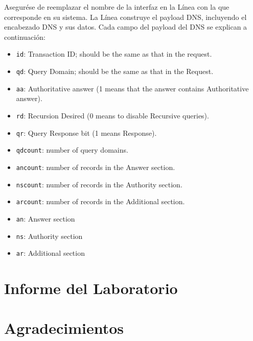 Asegurése de reemplazar el nombre de la interfaz en la Línea  con la que corresponde en su sistema.
La Línea  construye el payload DNS, incluyendo el encabezado DNS y sus datos. Cada campo del payload del DNS se explican a continuación:

 
\begin{itemize}[noitemsep]
\item \texttt{id}: Transaction ID; should be the same as that in the request.
\item \texttt{qd}: Query Domain; should be the same as that in the Request.
\item \texttt{aa}: Authoritative answer (1 means that the answer contains Authoritative answer).
\item \texttt{rd}: Recursion Desired (0 means to disable Recursive queries).
\item \texttt{qr}: Query Response bit (1 means Response).
\item \texttt{qdcount}: number of query domains. 
\item \texttt{ancount}: number of records in the Answer section.
\item \texttt{nscount}: number of records in the Authority section. 
\item \texttt{arcount}: number of records in the Additional section. 
\item \texttt{an}: Answer section 
\item \texttt{ns}: Authority section
\item \texttt{ar}: Additional section
\end{itemize}
  



\section{Informe del Laboratorio}




\section*{Agradecimientos}





